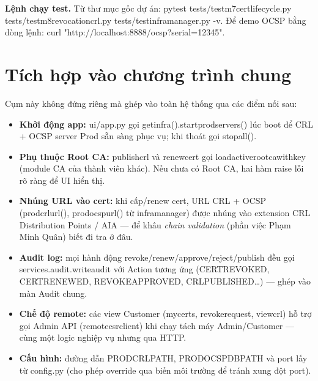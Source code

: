 \documentclass[12pt,a4paper]{article}
\newcommand{\code}[1]{{\ttfamily\small\def\_{\textunderscore\discretionary{}{}{}}#1}}
\begin{document}
\begin{notebox}
\textbf{Lệnh chạy test.} Từ thư mục gốc dự án:
\code{pytest tests/test\_m7\_cert\_lifecycle.py tests/test\_m8\_revocation\_crl.py
tests/test\_infra\_manager.py -v}. Để demo OCSP bằng dòng lệnh:
\code{curl "http://localhost:8888/ocsp?serial=12345"}.
\end{notebox}

\section{Tích hợp vào chương trình chung}

Cụm này không đứng riêng mà ghép vào toàn hệ thống qua các điểm nối sau:

\begin{itemize}
  \item \textbf{Khởi động app:} \code{ui/app.py} gọi
    \code{get\_infra().start\_prod\_servers()} lúc boot để CRL + OCSP server
    Prod sẵn sàng phục vụ; khi thoát gọi \code{stop\_all()}.
  \item \textbf{Phụ thuộc Root CA:} \code{publish\_crl} và \code{renew\_cert}
    gọi \code{load\_active\_root\_ca\_with\_key} (module CA của thành viên khác).
    Nếu chưa có Root CA, hai hàm raise lỗi rõ ràng để UI hiển thị.
  \item \textbf{Nhúng URL vào cert:} khi cấp/renew cert, URL CRL + OCSP
    (\code{prod\_crl\_url()}, \code{prod\_ocsp\_url()} từ \code{infra\_manager})
    được nhúng vào extension CRL Distribution Points / AIA --- để khâu
    \emph{chain validation} (phần việc Phạm Minh Quân) biết đi tra ở đâu.
  \item \textbf{Audit log:} mọi hành động revoke/renew/approve/reject/publish đều
    gọi \code{services.audit.write\_audit} với \code{Action} tương ứng
    (\code{CERT\_REVOKED}, \code{CERT\_RENEWED}, \code{REVOKE\_APPROVED},
    \code{CRL\_PUBLISHED}\ldots) --- ghép vào màn Audit chung.
  \item \textbf{Chế độ remote:} các view Customer (\code{my\_certs},
    \code{revoke\_request}, \code{view\_crl}) hỗ trợ gọi Admin API
    (\code{remote\_csr\_client}) khi chạy tách máy Admin/Customer --- cùng một
    logic nghiệp vụ nhưng qua HTTP.
  \item \textbf{Cấu hình:} đường dẫn \code{PROD\_CRL\_PATH},
    \code{PROD\_OCSP\_DB\_PATH} và port lấy từ \code{config.py} (cho phép override
    qua biến môi trường để tránh xung đột port).
\end{itemize}
\end{document}
